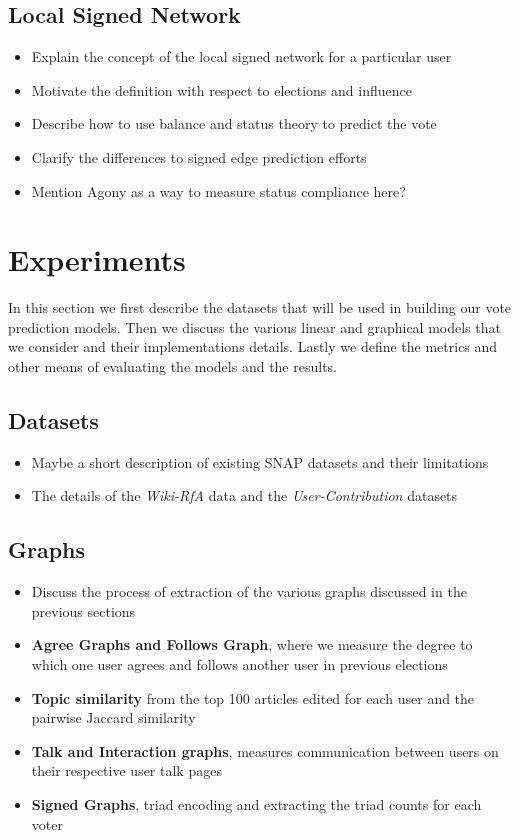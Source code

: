 \section{Local Signed Network}
\begin{itemize}
    \item Explain the concept of the local signed network for a particular user
    \item Motivate the definition with respect to elections and influence
    \item Describe how to use balance and status theory to predict the vote
    \item Clarify the differences to signed edge prediction efforts
    \item Mention Agony as a way to measure status compliance here?
\end{itemize}


\chapter{Experiments}
In this section we first describe the datasets that will be used in building our vote prediction models. Then we discuss the various linear and graphical models that we consider and their implementations details. Lastly we define the metrics and other means of evaluating the models and the results.

\section{Datasets}
\begin{itemize}
    \item Maybe a short description of existing SNAP datasets and their limitations
    \item The details of the \textit{Wiki-RfA} data and the \textit{User-Contribution} datasets
\end{itemize}
\section{Graphs}
\begin{itemize}
    \item Discuss the process of extraction of the various graphs discussed in the previous sections
    \item \textbf{Agree Graphs and Follows Graph}, where we measure the degree to which one user agrees and follows another user in previous elections
    \item \textbf{Topic similarity} from the top 100 articles edited for each user and the pairwise Jaccard similarity 
    \item \textbf{Talk and Interaction graphs}, measures communication between users on their respective user talk pages
    \item \textbf{Signed Graphs}, triad encoding and extracting the triad counts for each voter
\end{itemize}
